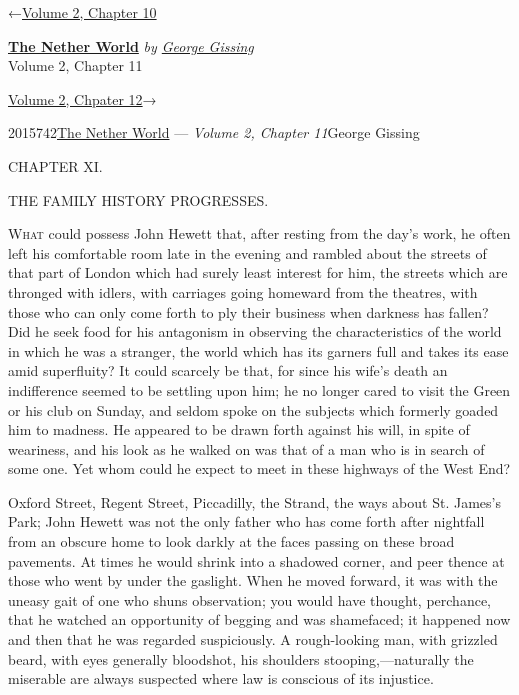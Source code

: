 \hypertarget{headerContainer}{}
\hypertarget{navigationHeader}{}
\protect\hypertarget{headerprevious}{}{←\href{/wiki/The_Nether_World/Volume_2/Chapter_10}{Volume
2, Chapter 10}}

\textbf{\protect\hypertarget{header_title_text}{}{\href{/wiki/The_Nether_World}{The
Nether World}}} \emph{by
\href{/wiki/Author:George_Gissing}{\protect\hypertarget{header_author_text}{}{{George
Gissing}}}}\\
\protect\hypertarget{header_section_text}{}{Volume 2, Chapter 11}

\protect\hypertarget{headernext}{}{\href{/wiki/The_Nether_World/Volume_2/Chapter_12}{Volume
2, Chpater 12}→}

\hypertarget{navigationNotes}{}

\hypertarget{ws-data}{}
\protect\hypertarget{ws-article-id}{}{2015742}\protect\hypertarget{ws-title}{}{\href{/wiki/The_Nether_World}{The
Nether World} --- \emph{Volume 2, Chapter
11}}\protect\hypertarget{ws-author}{}{George Gissing}

{\protect\hypertarget{216}{}{}}

{CHAPTER XI.}

THE FAMILY HISTORY PROGRESSES.

\textsc{What} could possess John Hewett that, after resting from the
day's work, he often left his comfortable room late in the evening and
rambled about the streets of that part of London which had surely least
interest for him, the streets which are thronged with idlers, with
carriages going homeward from the theatres, with those who can only come
forth to ply their business when darkness has fallen? Did he seek food
for his antagonism in observing the characteristics of the world in
which he was a stranger, the world which has its garners full and takes
its ease amid superfluity? It could scarcely be that, for since his
wife's death an indifference seemed to be settling upon him; he no
longer cared to visit the Green or his club on Sunday, and seldom spoke
on the subjects which formerly goaded {\protect\hypertarget{217}{}{}}him
to madness. He appeared to be drawn forth against his will, in spite of
weariness, and his look as he walked on was that of a man who is in
search of some one. Yet whom could he expect to meet in these highways
of the West End?

Oxford Street, Regent Street, Piccadilly, the Strand, the ways about St.
James's Park; John Hewett was not the only father who has come forth
after nightfall from an obscure home to look darkly at the faces passing
on these broad pavements. At times he would shrink into a shadowed
corner, and peer thence at those who went by under the gaslight. When he
moved forward, it was with the uneasy gait of one who shuns observation;
you would have thought, perchance, that he watched an opportunity of
begging and was shamefaced; it happened now and then that he was
regarded suspiciously. A rough-looking man, with grizzled beard, with
eyes generally bloodshot, his shoulders stooping,---naturally the
miserable are always suspected where law is conscious of its injustice.

